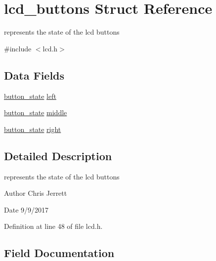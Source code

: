 \hypertarget{structlcd__buttons}{}\section{lcd\+\_\+buttons Struct Reference}
\label{structlcd__buttons}


represents the state of the lcd buttons  




{\ttfamily \#include $<$lcd.\+h$>$}

\subsection*{Data Fields}
\begin{DoxyCompactItemize}
\item 
\hyperlink{lcd_8h_a0bbab92f5605e16a4162b6c5ccc2c29b}{button\+\_\+state} \hyperlink{structlcd__buttons_ae385efb5ec794acf5f11027f46c6c039}{left}
\item 
\hyperlink{lcd_8h_a0bbab92f5605e16a4162b6c5ccc2c29b}{button\+\_\+state} \hyperlink{structlcd__buttons_a293342810ac56f73979b08f144d6e6b9}{middle}
\item 
\hyperlink{lcd_8h_a0bbab92f5605e16a4162b6c5ccc2c29b}{button\+\_\+state} \hyperlink{structlcd__buttons_a2437d744e09ca1bb91ab4ca53ef77198}{right}
\end{DoxyCompactItemize}


\subsection{Detailed Description}
represents the state of the lcd buttons 

\begin{DoxyAuthor}{Author}
Chris Jerrett 
\end{DoxyAuthor}
\begin{DoxyDate}{Date}
9/9/2017 
\end{DoxyDate}


Definition at line 48 of file lcd.\+h.



\subsection{Field Documentation}
\mbox{\label{structlcd__buttons_ae385efb5ec794acf5f11027f46c6c039}} 
